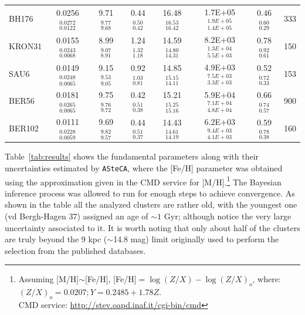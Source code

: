 \documentclass[draft]{aa}
\begin{document}
\begin{table}
\begin{tabular}{lccccccc}
  BH176 & 0.0256$_{0.0122}^{0.0272}$ & 9.71$_{9.68}^{9.77}$ & 0.44$_{0.42}^{0.50}$ &
  16.48$_{16.42}^{16.53}$ & 1.7E+05$_{1.4E+05}^{1.9E+05}$ & 0.46$_{0.29}^{0.60}$ &
  333 \\[.2cm]
  KRON31 & 0.0155$_{0.0068}^{0.0243}$ & 8.99 $_{8.91}^{9.07 }$ & 1.24$_{1.18}^{1.32}$ &
  14.59$_{14.31}^{14.80}$ & 8.2E+03$_{5.5E+03}^{1.3E+04}$ & 0.78$_{0.61}^{0.92}$ &
  150 \\[.2cm]
  SAU6 & 0.0149$_{0.0065}^{0.0248}$ & 9.15 $_{9.05}^{9.53 }$ & 0.92$_{0.81}^{1.03}$ &
  14.85$_{14.11}^{15.15}$ & 4.9E+03$_{3.3E+03}^{7.5E+03}$ & 0.52$_{0.33}^{0.72}$ &
  153 \\[.2cm]
  BER56 & 0.0181$_{0.0065}^{0.0265}$ & 9.75 $_{9.72}^{9.76 }$ & 0.42$_{0.38}^{0.51}$ &
  15.21$_{15.16}^{15.25}$ & 5.9E+04$_{4.8E+04}^{7.1E+04}$ & 0.66$_{0.57}^{0.74}$ &
  900 \\[.2cm]
  BER102 & 0.0111$_{0.0059}^{0.0228}$ & 9.69 $_{9.57}^{9.82 }$ & 0.44$_{0.37}^{0.51}$ &
  14.43$_{14.19}^{14.61}$ & 6.2E+03$_{4.1E+03}^{9.4E+03}$ & 0.59$_{0.38}^{0.78}$ &
  160 \\[.2cm]
  \hline
  \end{tabular}
  \end{table}

  Table~\ref{tab:results} shows the fundamental parameters along with their
  uncertainties estimated by \texttt{ASteCA}, where the [Fe/H] parameter was
  obtained using the approximation given in the CMD service for
  [M/H].\footnote{Assuming [M/H]$\sim$[Fe/H], [Fe/H]$=\log(Z/X)-\log(Z/X)_{o}$, where:
  $(Z/X)_{o}=0.0207; Y=0.2485+1.78Z$.\\
  CMD service: \url{http://stev.oapd.inaf.it/cgi-bin/cmd}}
  The Bayesian inference process was
  allowed to run for enough steps to achieve convergence.
  As shown in the table all the analyzed clusters are rather old, with the
  youngest one (vd Bergh-Hagen 37) assigned an age of $\sim1$ Gyr; although
  notice the very large uncertainty associated to it. It is worth noting
  that only about half of the clusters are truly beyond the 9 kpc ($\sim$14.8
  mag) limit originally used to perform the selection from the published
  databases.\\
\end{document}
